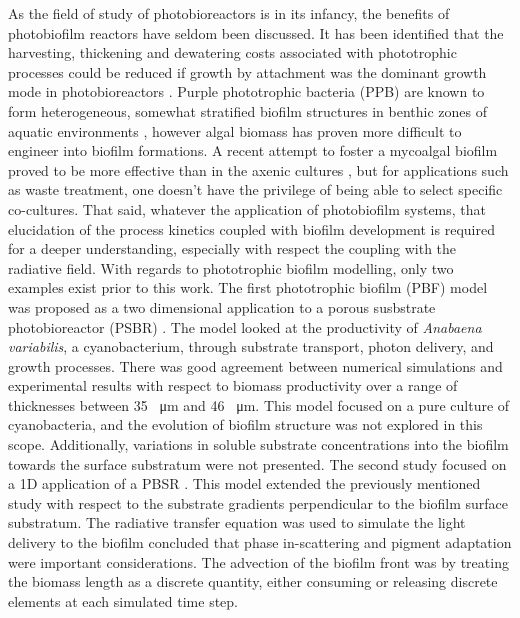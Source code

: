 As the field of study of photobioreactors is in its infancy, the benefits of photobiofilm reactors have seldom been discussed. It has been identified that the harvesting, thickening and dewatering costs associated with phototrophic processes could be reduced if growth by attachment was the dominant growth mode in photobioreactors  \cite{Hulsen2016a}. Purple phototrophic bacteria (PPB) are known to form heterogeneous, somewhat stratified biofilm structures in benthic zones of aquatic environments \cite{Overmann2006}, however algal biomass has proven more difficult to engineer into biofilm formations. A recent attempt to foster a mycoalgal biofilm proved to be more effective than in the axenic cultures \cite{rajendran2016}, but for applications such as waste treatment, one doesn't have the privilege of being able to select specific co-cultures. That said, whatever the application of photobiofilm systems, that elucidation of the process kinetics coupled with biofilm development is required for a deeper understanding, especially with respect the coupling with the radiative field.
\skippingparagraph
With regards to phototrophic biofilm modelling, only two examples exist prior to this work. The first phototrophic biofilm (PBF) model was proposed as a two dimensional application to a porous susbstrate photobioreactor (PSBR) \cite{murphy2014}. The model looked at the productivity of \textit{Anabaena variabilis}, a cyanobacterium, through substrate transport, photon delivery, and growth processes. There was good agreement between numerical simulations and experimental results with respect to biomass productivity over a range of thicknesses between 35 \SI{}{\micro\metre} and 46 \SI{}{\micro\metre}. This model focused on a pure culture of cyanobacteria, and the evolution of biofilm structure was not explored in this scope. Additionally, variations in soluble substrate concentrations into the biofilm towards the surface substratum were not presented. 
\skippingparagraph
The second study focused on a 1D application of a PBSR \cite{Li2016}. This model extended the previously mentioned study with respect to the substrate gradients perpendicular to the biofilm surface substratum. The radiative transfer equation was used to simulate the light delivery to the biofilm concluded that phase in-scattering and pigment adaptation were important considerations. The advection of the biofilm front was by treating the biomass length as a discrete quantity, either consuming or releasing discrete elements at each simulated time step. \skippingparagraph

